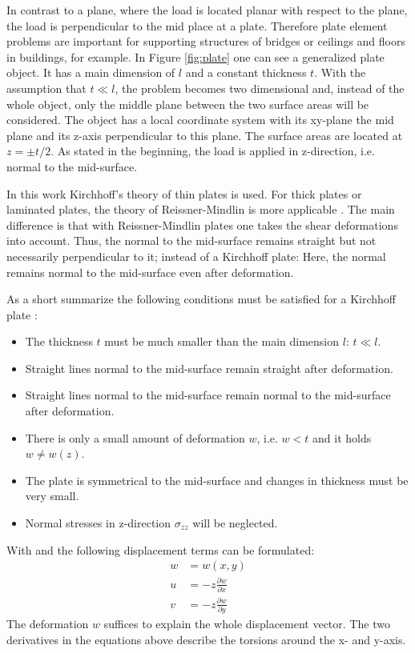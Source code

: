   In contrast to a plane, where the load is located planar with respect to the plane, the load is perpendicular to the mid place at a plate. Therefore plate element problems are important for supporting structures of bridges or ceilings and floors in buildings, for example. In Figure \ref{fig:plate} one can see a generalized plate object. It has a main dimension of $l$ and a constant thickness $t$. With the assumption that $t \ll l$, the problem becomes two dimensional and, instead of the whole object, only the middle plane between the two surface areas will be considered. The object has a local coordinate system with its xy-plane the mid plane and its z-axis perpendicular to this plane. The surface areas are located at $z = \pm t/2$. As stated in the beginning, the load is applied in z-direction, i.e. normal to the mid-surface.
  
  In this work Kirchhoff's theory of thin plates is used. For thick plates or laminated plates, the theory of Reissner-Mindlin is more applicable \cite{werkle1995finite}. The main difference is that with Reissner-Mindlin plates one takes the shear deformations into account. Thus, the normal to the mid-surface remains straight but not necessarily perpendicular to it; instead of a Kirchhoff plate: Here, the normal remains normal to the mid-surface even after deformation.
  
  As a short summarize the following conditions must be satisfied for a Kirchhoff plate \cite{steinke2005finite}:
  \begin{itemize}
  	\item The thickness $t$ must be much smaller than the main dimension $l$: $t \ll l$.
  	\item Straight lines normal to the mid-surface remain straight after deformation.
  	\item Straight lines normal to the mid-surface remain normal to the mid-surface after deformation.
  	\item There is only a small amount of deformation $w$, i.e. $w < t$ and it holds $w \ne w(z)$.
  	\item The plate is symmetrical to the mid-surface and changes in thickness must be very small.
  	\item Normal stresses in z-direction $\sigma_{zz}$ will be neglected.
  \end{itemize}
  
  With \cite{klein2013fem} and \cite{steinke2005finite} the following displacement terms can be formulated:
  \begin{align}
  w &= w(x,y) \\
  u &= -z \frac{\partial w}{\partial x}\\
  v &= -z \frac{\partial w}{\partial y}
  \end{align}
  The deformation $w$ suffices to explain the whole displacement vector. The two derivatives in the equations above describe the torsions around the x- and y-axis.

